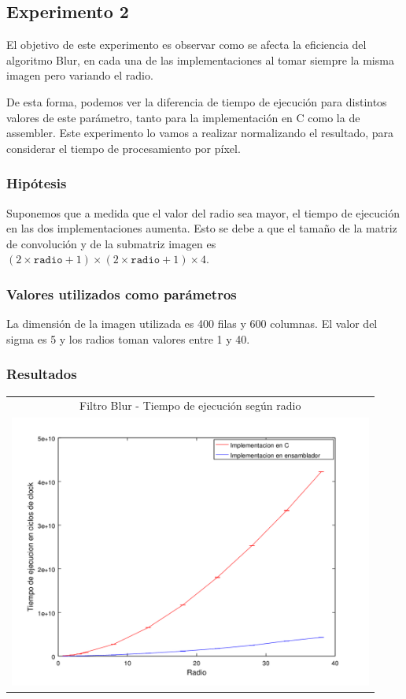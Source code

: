 	\subsection{Experimento 2}
		El objetivo de este experimento es observar como se afecta la eficiencia del algoritmo Blur, en cada una de las implementaciones al tomar siempre la misma imagen pero variando el radio.
	
		De esta forma, podemos ver la diferencia de tiempo de ejecución para distintos valores de este parámetro, tanto para la implementación en C como la de assembler. Este experimento lo vamos a realizar normalizando el resultado, para considerar el tiempo de procesamiento por píxel.

		\subsubsection{Hipótesis} 
			Suponemos que a medida que el valor del radio sea mayor, el tiempo de ejecución en las dos implementaciones aumenta. Esto se debe a que el tamaño de la matriz de convolución y de la submatriz imagen es $(2 \times \mathtt{radio} + 1) \times (2 \times \mathtt{radio} + 1) \times 4$. 

		\subsubsection{Valores utilizados como parámetros} 
		La dimensión de la imagen utilizada es 400 filas y 600 columnas. El valor del sigma es 5 y los radios toman valores entre 1 y 40.

		\subsubsection{Resultados}

		{\centering \begin{tabular}{c}
      		{\small Filtro Blur - Tiempo de ejecución según radio} \\
      		\includegraphics[width=12cm]{../exp/graficos/exp2-tiempo_segun_radio.png} \\
    	\end{tabular}}

